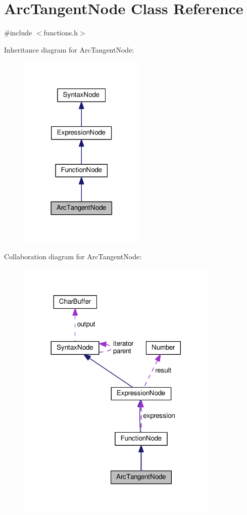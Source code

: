 \hypertarget{classArcTangentNode}{}\section{Arc\+Tangent\+Node Class Reference}
\label{classArcTangentNode}


{\ttfamily \#include $<$functions.\+h$>$}



Inheritance diagram for Arc\+Tangent\+Node\+:\nopagebreak
\begin{figure}[H]
\begin{center}
\leavevmode
\includegraphics[width=170pt]{classArcTangentNode__inherit__graph}
\end{center}
\end{figure}


Collaboration diagram for Arc\+Tangent\+Node\+:\nopagebreak
\begin{figure}[H]
\begin{center}
\leavevmode
\includegraphics[width=272pt]{classArcTangentNode__coll__graph}
\end{center}
\end{figure}
